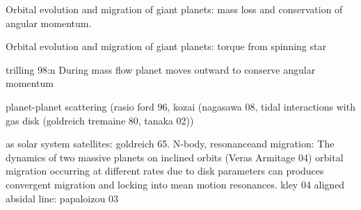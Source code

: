 

\begin{workout}
Orbital evolution and migration of giant planets: mass loss and conservation of angular momentum.
\end{workout}

\begin{workout}
Orbital evolution and migration of giant planets: torque from spinning star
\end{workout}

\begin{workout}
trilling 98:n During mass flow planet moves outward to conserve angular momentum
\end{workout}

\begin{workout}
planet-planet scattering (rasio ford 96, kozai (nagasawa 08, tidal interactions with gas disk (goldreich tremaine 80, tanaka 02))
\end{workout}

\begin{workout}
as solar system satellites: goldreich 65.
N-body, resonanceand migration: The dynamics of two massive planets on inclined orbits (Veras Armitage 04)
orbital migration occurring at different rates due to disk parameters can produces convergent migration and locking into mean motion resonances.
kley 04
aligned absidal line: papaloizou 03
\end{workout}
